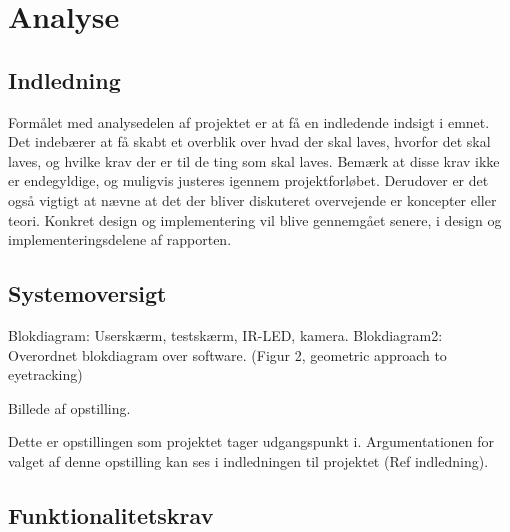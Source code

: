 \documentclass[rapport.tex]{subfiles}
\begin{document}
\section{Analyse}
	\subsection{Indledning}
	Formålet med analysedelen af projektet er at få en indledende indsigt i emnet. Det indebærer at få skabt et overblik over hvad der skal laves, hvorfor det skal laves, og hvilke krav der er til de ting som skal laves. Bemærk at disse krav ikke er endegyldige, og muligvis justeres igennem projektforløbet. Derudover er det også vigtigt at nævne at det der bliver diskuteret overvejende er koncepter eller teori. Konkret design og implementering vil blive gennemgået senere, i design og implementeringsdelene af rapporten.
	\subsection{Systemoversigt}
	
	Blokdiagram: Userskærm, testskærm, IR-LED, kamera.
	Blokdiagram2: Overordnet blokdiagram over software. (Figur 2, geometric approach to eyetracking)
	
	Billede af opstilling.
	
	
	
	
	Dette er opstillingen som projektet tager udgangspunkt i. Argumentationen for	valget af denne opstilling kan ses i indledningen til projektet (Ref indledning).
	
	\subsection{Funktionalitetskrav}
	
\end{document}
